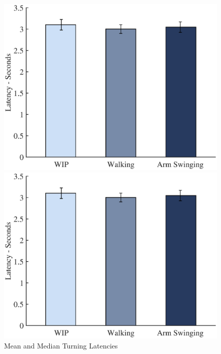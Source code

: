 \documentclass[titlepage]{article}
\theoremstyle{definition}
\theoremstyle{proof}
\begin{document}
\begin{figure}[h]
  \centering
  \begin{minipage}[h]{.45\linewidth}
    \includegraphics[scale=.32]{figures/lat_mean.eps}
  \end{minipage}
  \quad
  \begin{minipage}[h]{.45\linewidth}
    \includegraphics[scale=.32]{figures/lat_median.eps}
  \end{minipage}
  \caption{Mean and Median Turning Latencies}
  \label{fig:turning_latencies}
\end{figure}
\end{document}
